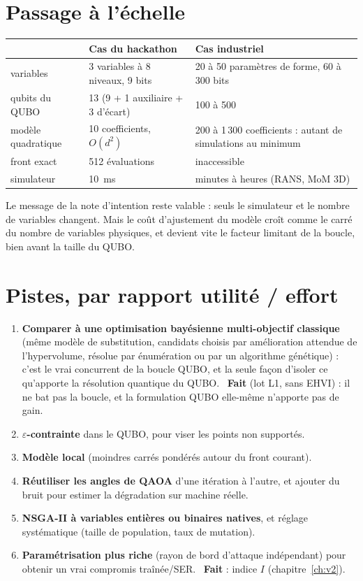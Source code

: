 \section{Passage à l'échelle}
\begin{center}
\renewcommand{\arraystretch}{1.2}
\begin{tabularx}{\linewidth}{lXX}
\toprule
 & Cas du hackathon & Cas industriel \\
\midrule
variables & 3 variables à 8 niveaux, 9 bits & 20 à 50 paramètres de forme, 60 à 300 bits \\
qubits du QUBO & 13 (9 + 1 auxiliaire + 3 d'écart) & 100 à 500 \\
modèle quadratique & 10 coefficients, $O(d^2)$ & 200 à 1\,300 coefficients : autant de simulations au minimum \\
front exact & 512 évaluations & inaccessible \\
simulateur & 10~ms & minutes à heures (RANS, MoM 3D) \\
\bottomrule
\end{tabularx}
\end{center}
Le message de la note d'intention reste valable : seuls le simulateur et le nombre de variables changent. Mais le coût d'ajustement du modèle croît comme le carré du nombre de variables physiques, et devient vite le facteur limitant de la boucle, bien avant la taille du QUBO.

\section{Pistes, par rapport utilité / effort}
\begin{enumerate}
\item \textbf{Comparer à une optimisation bayésienne multi-objectif classique} (même modèle de substitution, candidats choisis par amélioration attendue de l'hypervolume, résolue par énumération ou par un algorithme génétique) : c'est le vrai concurrent de la boucle QUBO, et la seule façon d'isoler ce qu'apporte la résolution quantique du QUBO. ~\textbf{Fait} (lot L1, sans EHVI) : il ne bat pas la boucle, et la formulation QUBO elle-même n'apporte pas de gain.
\item \textbf{$\varepsilon$-contrainte} dans le QUBO, pour viser les points non supportés.
\item \textbf{Modèle local} (moindres carrés pondérés autour du front courant).
\item \textbf{Réutiliser les angles de QAOA} d'une itération à l'autre, et ajouter du bruit pour estimer la dégradation sur machine réelle.
\item \textbf{NSGA-II à variables entières ou binaires natives}, et réglage systématique (taille de population, taux de mutation).
\item \textbf{Paramétrisation plus riche} (rayon de bord d'attaque indépendant) pour obtenir un vrai compromis traînée/SER. ~\textbf{Fait} : indice $I$ (chapitre~\ref{ch:v2}).
\end{enumerate}

